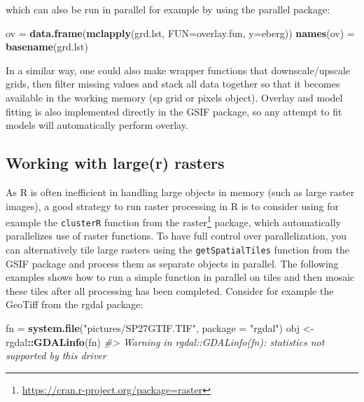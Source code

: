 \documentclass[11pt]{krantz}
\newenvironment{Shaded}{\begin{snugshade}}{\end{snugshade}}
\newcommand{\CommentTok}[1]{\textcolor[rgb]{0.37,0.37,0.37}{\textit{#1}}}
\newcommand{\DataTypeTok}[1]{\textcolor[rgb]{0.27,0.27,0.27}{#1}}
\newcommand{\KeywordTok}[1]{\textcolor[rgb]{0.27,0.27,0.27}{\textbf{#1}}}
\newcommand{\NormalTok}[1]{#1}
\newcommand{\OperatorTok}[1]{\textcolor[rgb]{0.43,0.43,0.43}{\textbf{#1}}}
\newcommand{\StringTok}[1]{\textcolor[rgb]{0.5,0.5,0.5}{#1}}
\renewcommand{\href}[2]{#2\footnote{\url{#1}}}
\theoremstyle{definition}
\theoremstyle{definition}
\theoremstyle{definition}
\theoremstyle{remark}
\begin{document}
which can also be run in parallel for example by using the parallel
package:

\begin{Shaded}
\begin{Highlighting}[]
\NormalTok{ov =}\StringTok{ }\KeywordTok{data.frame}\NormalTok{(}\KeywordTok{mclapply}\NormalTok{(grd.lst, }\DataTypeTok{FUN=}\NormalTok{overlay.fun, }\DataTypeTok{y=}\NormalTok{eberg))}
\KeywordTok{names}\NormalTok{(ov) =}\StringTok{ }\KeywordTok{basename}\NormalTok{(grd.lst)}
\end{Highlighting}
\end{Shaded}

In a similar way, one could also make wrapper functions that
downscale/upscale grids, then filter missing values and stack all data
together so that it becomes available in the working memory (sp grid or
pixels object). Overlay and model fitting is also implemented directly
in the GSIF package, so any attempt to fit models will automatically
perform overlay.

\hypertarget{working-with-larger-rasters}{%
\subsection{Working with large(r)
rasters}\label{working-with-larger-rasters}}

As R is often inefficient in handling large objects in memory (such as
large raster images), a good strategy to run raster processing in R is
to consider using for example the \texttt{clusterR} function from the
\href{https://cran.r-project.org/package=raster}{raster} package, which
automatically parallelizes use of raster functions. To have full control
over parallelization, you can alternatively tile large rasters using the
\texttt{getSpatialTiles} function from the GSIF package and process them
as separate objects in parallel. The following examples shows how to run
a simple function in parallel on tiles and then mosaic these tiles after
all processing has been completed. Consider for example the GeoTiff from
the rgdal package:

\begin{Shaded}
\begin{Highlighting}[]
\NormalTok{fn =}\StringTok{ }\KeywordTok{system.file}\NormalTok{(}\StringTok{"pictures/SP27GTIF.TIF"}\NormalTok{, }\DataTypeTok{package =} \StringTok{"rgdal"}\NormalTok{)}
\NormalTok{obj <-}\StringTok{ }\NormalTok{rgdal}\OperatorTok{::}\KeywordTok{GDALinfo}\NormalTok{(fn)}
\CommentTok{#> Warning in rgdal::GDALinfo(fn): statistics not supported by this driver}
\end{Highlighting}
\end{Shaded}
\end{document}
